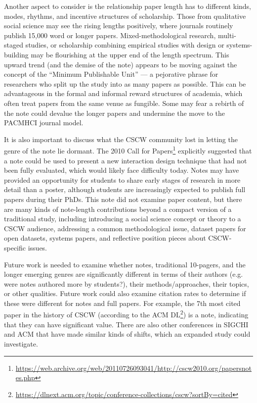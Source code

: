 \documentclass[format=acmsmall, screen=true]{acmart}
\begin{document}
Another aspect to consider is the relationship paper length has to different kinds, modes, rhythms, and incentive structures of scholarship. Those from qualitative social science may see the rising lengths positively, where journals routinely publish 15,000 word or longer papers. Mixed-methodological research, multi-staged studies, or scholarship combining empirical studies with design or systems-building may be flourishing at the upper end of the length spectrum. This upward trend (and the demise of the note) appears to be moving against the concept of the ``Minimum Publishable Unit'' --- a pejorative phrase for researchers who split up the study into as many papers as possible. This can be advantageous in the formal and informal reward structures of academia, which often treat papers from the same venue as fungible. Some may fear a rebirth of the note could devalue the longer papers and undermine the move to the PACMHCI journal model.

It is also important to discuss what the CSCW community lost in letting the genre of the note lie dormant. The 2010 Call for Papers\footnote{ \url{https://web.archive.org/web/20110726093041/http://cscw2010.org/papersnotes.php}} explicitly suggested that a note could be used to present a new interaction design technique that had not been fully evaluated, which would likely face difficulty today. Notes may have provided an opportunity for students to share early stages of research in more detail than a poster, although students are increasingly expected to publish full papers during their PhDs. This note did not examine paper content, but there are many kinds of note-length contributions beyond a compact version of a traditional study, including introducing a social science concept or theory to a CSCW audience, addressing a common methodological issue, dataset papers for open datasets, systems papers, and reflective position pieces about CSCW-specific issues. 

Future work is needed to examine whether notes, traditional 10-pagers, and the longer emerging genres are significantly different in terms of their authors (e.g. were notes authored more by students?), their methods/approaches, their topics, or other qualities. Future work could also examine citation rates to determine if these were different for notes and full papers. For example, the 7th most cited paper in the history of CSCW (according to the ACM DL\footnote{ \url{https://dlnext.acm.org/topic/conference-collections/cscw?sortBy=cited}}) is a note, indicating that they can have significant value. There are also other conferences in SIGCHI and ACM that have made similar kinds of shifts, which an expanded study could investigate.
\end{document}
